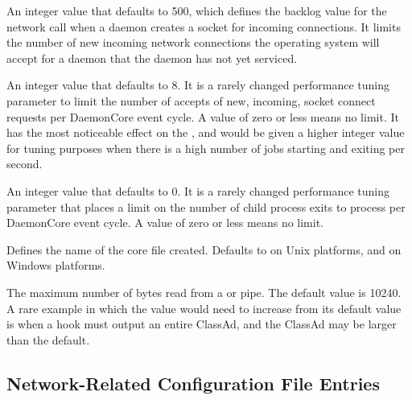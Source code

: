 \begin{description}
\label{param:SocketListenBacklog}
\item[\Macro{SOCKET\_LISTEN\_BACKLOG}]
  An integer value that defaults to 500,
  which defines the backlog value for the  
  network call when a daemon creates a socket for incoming connections.
  It limits the number of new incoming network connections the operating
  system will accept for a daemon that the daemon has not yet serviced.

\label{param:MaxAcceptsPerCycle}
\item[\Macro{MAX\_ACCEPTS\_PER\_CYCLE}]
  An integer value that defaults to 8.
  It is a rarely changed performance tuning parameter to
  limit the number of accepts of new, incoming,
  socket connect requests per DaemonCore event cycle.
  A value of zero or less means no limit.
  It has the most noticeable effect on the ,
  and would be given a higher integer value for tuning purposes when 
  there is a high number of jobs starting and exiting per second.

\label{param:MaxReapsPerCycle}
\item[\Macro{MAX\_REAPS\_PER\_CYCLE}]
  An integer value that defaults to 0.  It is a rarely changed performance
  tuning parameter that places a limit on the number of child process exits to
  process per DaemonCore event cycle.  A value of zero or less means no limit.

\label{param:CoreFileName}
\item[\Macro{CORE\_FILE\_NAME}]
  Defines the name of the core file created.
  Defaults to  on Unix platforms,
  and  on Windows platforms.   

\label{param:PipeBufferMax}
\item[\Macro{PIPE\_BUFFER\_MAX}]
  The maximum number of bytes read from a  or  pipe.
  The default value is 10240.
  A rare example in which the value would need to increase from
  its default value is when a hook must output an entire ClassAd,
  and the ClassAd may be larger than the default.

\end{description}

\subsection{\label{sec:Network-Related-Config-File-Entries}Network-Related Configuration File Entries}

